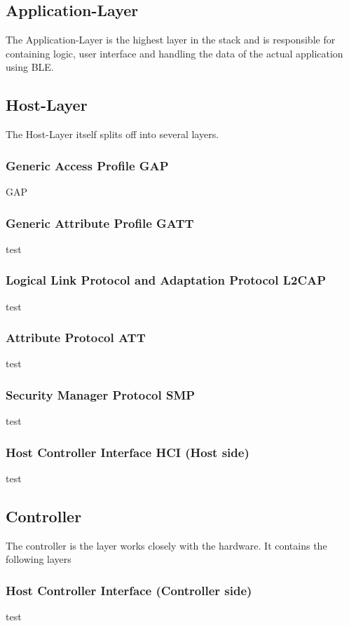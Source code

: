 \subsection{Application-Layer}
The Application-Layer is the highest layer in the stack and is responsible for containing logic, user interface and handling the data of the actual application using BLE.

\subsection{Host-Layer}
The Host-Layer itself splits off into several layers.

\subsubsection{Generic Access Profile GAP}
GAP

\subsubsection{Generic Attribute Profile GATT}
test

\subsubsection{Logical Link Protocol and Adaptation Protocol L2CAP}
test

\subsubsection{Attribute Protocol ATT}
test

\subsubsection{Security Manager Protocol SMP}
test

\subsubsection{Host Controller Interface HCI (Host side)}
test

\subsection{Controller}
The controller is the layer works closely with the hardware. It contains the following layers

\subsubsection{Host Controller Interface (Controller side)}
test
